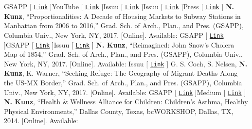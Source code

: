 \documentclass{article}
\begin{document}
        \faTrain\space GSAPP [ \href{https://www.arch.columbia.edu/courses/87029-1878-genoa-italy-negotiating-fragments}{\texttt{Link}} ]\space\faYoutube\space YouTube [ \href{https://www.youtube.com/watch?v=NaVhil1sQfY}{\texttt{Link}} ]\space\faBook\space Issuu [ \href{https://issuu.com/nickkunz/docs/geotagged_genoa}{\texttt{Link}} ]\space\faBook\space Issuu [ \href{https://issuu.com/nickkunz/docs/quarto}{\texttt{Link}} ]\space\faNewspaper\space Press [ \href{http://www.comune.genova.it/content/restructuring-quarto-workshop-le-idee-degli-studenti-della-columbia-university-l39ex-op}{\texttt{Link}} ]\newline\newline
        \textbf{N. Kunz}, ``Proportionalities: A Decade of Housing Markets to Subway Stations in Manhattan from 2006 to 2016,'' Grad. Sch. of Arch., Plan., and Pres. (GSAPP), Columbia Univ., New York, NY, 2017. [Online]. Available:\newline\newline
        \faTrain\space GSAPP [ \href{https://www.arch.columbia.edu/student-work/4836}{\texttt{Link}} ]\space\faTrain\space GSAPP [ \href{https://www.arch.columbia.edu/student-work/4835}{\texttt{Link}} ]\space\faBook\space Issuu [ \href{https://issuu.com/nickkunz/docs/gis}{\texttt{Link}} ]\newline\newline
        \textbf{N. Kunz}, ``Reimagined: John Snow's Cholera Map of 1854,'' Grad. Sch. of Arch., Plan., and Pres. (GSAPP), Columbia Univ., New York, NY, 2017. [Online]. Available:\newline\newline
        \faBook\space Issuu [ \href{https://issuu.com/nickkunz/docs/reimagined}{\texttt{Link}} ]\newline\newline
        G. S. Coch, S. Nelsen, \textbf{N. Kunz}, K. Warner, ``Seeking Refuge: The Geography of Migrant Deaths Along the US-MX Border,'' Grad. Sch. of Arch., Plan., and Pres. (GSAPP), Columbia Univ., New York, NY, 2017. [Online]. Available:\newline\newline
        \faTrain\space GSAPP [ \href{https://www.arch.columbia.edu/student-work/4895}{\texttt{Link}} ]\space\faMedium\space Medium [ \href{https://medium.com/data-mining-the-city/seeking-refuge-the-geography-of-migrant-deaths-near-the-us-mx-border-b0f8f8be84ec}{\texttt{Link}} ]\newline\newline
        \textbf{N. Kunz}, ``Health \& Wellness Alliance for Children: Children's Asthma, Healthy Physical Environments,'' Dallas County, Texas, bcWORKSHOP, Dallas, TX, 2014. [Online]. Available:\newline\newline
\end{document}
